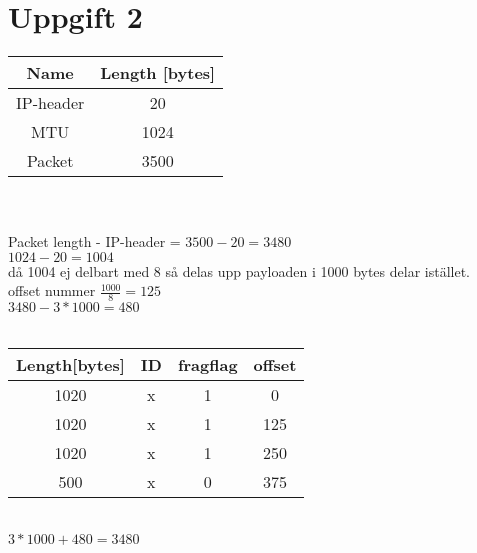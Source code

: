 \section{Uppgift 2}
\paragraph{}

\begin{center}
\begin{tabular}{c|c} 
 Name & Length [bytes]\\ 
 \hline
 IP-header & 20 \\ 
 MTU & 1024 \\ 
 Packet & 3500 \\ 
\end{tabular}
\end{center}
\\

\\ Packet length - IP-header = $ 3500 - 20 = 3480 $
\\ $ 1024 - 20 = 1004 $
\\ då 1004 ej delbart med 8 så delas upp payloaden i 1000 bytes delar istället.
\\ offset nummer $ \frac{1000}{8} = 125 $
\\ $ 3480 - 3* 1000 = 480 $
\\ \\

\begin{center}
\begin{tabular}{c|c|c|c} 

 Length[bytes] & ID &  fragflag & offset \\ 
 \hline
 1020 & x & 1 & 0 \\ 
 1020 & x & 1 & 125 \\ 
 1020 & x & 1 & 250 \\ 
 500 & x & 0 & 375 \\ 
\end{tabular}
\end{center}
\\
$3*1000 + 480 = 3480$
